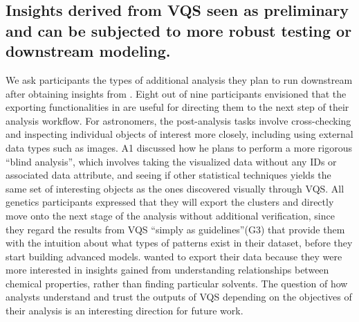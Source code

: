 \subsection{Insights derived from VQS seen as preliminary and can be subjected to more robust testing or downstream modeling.}
\par We ask participants the types of additional analysis they plan to run downstream after obtaining insights from \zv. Eight out of nine participants envisioned that the exporting functionalities in \zv are useful for directing them to the next step of their analysis workflow. For astronomers, the post-analysis tasks involve cross-checking and inspecting individual objects of interest more closely, including using external data types such as images. A1 discussed how he plans to perform a more rigorous ``blind analysis'', which involves taking the visualized data without any IDs or associated data attribute, and seeing if other statistical techniques yields the same set of interesting objects as the ones discovered visually through VQS. All genetics participants expressed that they will export the clusters and directly move onto the next stage of the analysis without additional verification, since they regard the results from VQS ``simply as guidelines''(G3) that provide them with the intuition about what types of patterns exist in their dataset, before they start building advanced models.  wanted to export their data because they were more interested in insights gained from understanding relationships between chemical properties, rather than finding particular solvents. The question of how analysts understand and trust the outputs of VQS depending on the objectives of their analysis is an interesting direction for future work.